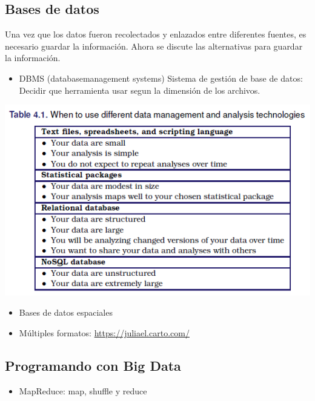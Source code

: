 \documentclass[
]{book}
\providecommand{\tightlist}{%
  \setlength{\itemsep}{0pt}\setlength{\parskip}{0pt}}
\begin{document}
\hypertarget{bases-de-datos-1}{%
\subsection{Bases de datos}\label{bases-de-datos-1}}

Una vez que los datos fueron recolectados y enlazados entre diferentes fuentes, es necesario guardar la información. Ahora se discute las alternativas para guardar la información.

\begin{itemize}
\tightlist
\item
  DBMS (databasemanagement systems) Sistema de gestión de base de datos: Decidir que herramienta usar segun la dimensión de los archivos.
\end{itemize}

\includegraphics{images/bd3.PNG}

\begin{itemize}
\tightlist
\item
  Bases de datos espaciales
\item
  Múltiples formatos: \url{https://juliael.carto.com/}
\end{itemize}

\hypertarget{programando-con-big-data}{%
\subsection{Programando con Big Data}\label{programando-con-big-data}}

\begin{itemize}
\tightlist
\item
  MapReduce: map, shuffle y reduce
\end{itemize}
\end{document}
